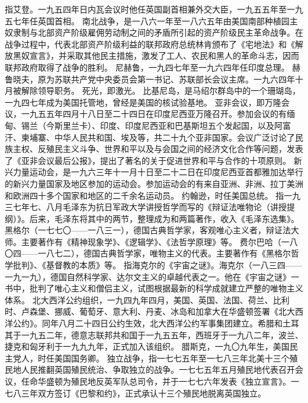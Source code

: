 \begin{maonote}
指艾登。一九五四年日内瓦会议时他任英国副首相兼外交大臣，一九五五年至一九五七年任英国首相。
南北战争，是一八六一年至一八六五年由美国南部种植园主奴隶制与北部资产阶级雇佣劳动制之间的矛盾所引起的资产阶级民主革命战争。在战争过程中，代表北部资产阶级利益的联邦政府总统林肯颁布了《宅地法》和《解放黑奴宣言》，并采取其他民主措施，激发了工人、农民和黑人的革命斗志，因而联邦政府取得了战争的胜利。
尼赫鲁，一九四七年至一九六四年任印度总理。
赫鲁晓夫，原为苏联共产党中央委员会第一书记、苏联部长会议主席。一九六四年十月被解除领导职务。
死光，即激光。
比基尼岛，是马绍尔群岛中的一个珊瑚岛，一九四七年成为美国托管地，曾经是美国的核试验基地。
亚非会议，即万隆会议，一九五五年四月十八日至二十四日在印度尼西亚万隆召开。参加会议的有缅甸、锡兰（今斯里兰卡）、印度、印度尼西亚和巴基斯坦五个发起国，以及阿富汗、柬埔寨、中华人民共和国、埃及等，共二十九个亚非国家。会议广泛讨论了民族主权、反殖民主义斗争、世界和平以及与会国之间的经济文化合作等问题，发表了《亚非会议最后公报》，提出了著名的关于促进世界和平与合作的十项原则。
新兴力量运动会，是一九六三年十一月十日至二十二日在印度尼西亚首都雅加达举行的新兴力量国家及地区参加的运动会。参加运动会的有来自亚洲、非洲、拉丁美洲和欧洲四十多个国家和地区的二千余名运动员。
约翰逊，时任美国总统。
指一九三七年七、八月毛泽东为抗日军政大学讲授哲学而写的《辩证法唯物论（讲授提纲）》。后来，毛泽东将其中的两节，整理成为和两篇著作，收入《毛泽东选集》。
黑格尔（一七七〇——一八三一），德国古典哲学家，客观唯心主义者，辩证法大师。主要著作有《精神现象学》、《逻辑学》、《法哲学原理》等。
费尔巴哈（一八〇四——一八七二），德国古典哲学家，唯物主义的代表。主要著作有《黑格尔哲学批判》、《基督教的本质》等。
指海克尔的《宇宙之谜》。海克尔（一八三四——一九一九），德国自然科学家、达尔文主义的卓越代表之一。他在《宇宙之谜》一书中，批判了唯心主义和僧侣主义，试图根据最新的科学成就建立严整的唯物主义体系。
北大西洋公约组织，一九四九年四月，美国、英国、法国、荷兰、比利时、卢森堡、挪威、葡萄牙、意大利、丹麦、冰岛和加拿大在华盛顿签署《北大西洋公约》。同年八月二十四日公约生效，北大西洋公约军事集团建立。希腊和土耳其于一九五二年，德意志联邦共和国于一九五五年，西班牙于一九八二年，波兰、捷克和匈牙利于一九九九年，正式加入该组织。
腊斯克，一九〇九年生，美国民主党人，时任美国国务卿。
独立战争，指一七七五年至一七八三年北美十三个殖民地人民推翻英国殖民统治、争取独立的战争。一七七五年五月殖民地代表召开会议，任命华盛顿为殖民地反英军队总司令，并于一七七六年发表《独立宣言》。一七八三年双方签订《巴黎和约》，正式承认十三个殖民地脱离英国独立。

\end{maonote}
